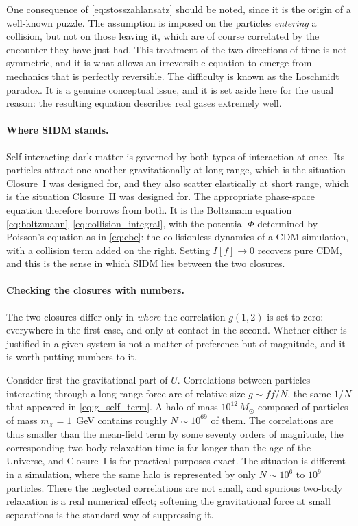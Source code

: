 \documentclass[12pt]{article}
\newcommand{\Msun}{\,M_\odot}
\begin{document}
One consequence of \eqref{eq:stosszahlansatz} should be noted, since it
is the origin of a well-known puzzle.  The assumption is imposed on the
particles \emph{entering} a collision, but not on those leaving it,
which are of course correlated by the encounter they have just had.
This treatment of the two directions of time is not symmetric, and it
is what allows an irreversible equation to emerge from mechanics that
is perfectly reversible.  The difficulty is known as the Loschmidt
paradox.  It is a genuine conceptual issue, and it is set aside here
for the usual reason: the resulting equation describes real gases
extremely well.

\paragraph{Where SIDM stands.}  Self-interacting dark matter is
governed by both types of interaction at once.  Its particles attract
one another gravitationally at long range, which is the situation
Closure~I was designed for, and they also scatter elastically at short
range, which is the situation Closure~II was designed for.  The
appropriate phase-space equation therefore borrows from both.  It is
the Boltzmann equation
\eqref{eq:boltzmann}--\eqref{eq:collision_integral}, with the potential
$\Phi$ determined by Poisson's equation as in \eqref{eq:cbe}: the
collisionless dynamics of a CDM simulation, with a collision term added
on the right.  Setting $I[f]\to 0$ recovers pure CDM, and this is the
sense in which SIDM lies between the two closures.

\paragraph{Checking the closures with numbers.}  The two closures
differ only in \emph{where} the correlation $g(1,2)$ is set to zero:
everywhere in the first case, and only at contact in the second.
Whether either is justified in a given system is not a matter of
preference but of magnitude, and it is worth putting numbers to it.

Consider first the gravitational part of $U$.  Correlations between
particles interacting through a long-range force are of relative size
$g\sim ff/N$, the same $1/N$ that appeared in \eqref{eq:g_self_term}.
A halo of mass $10^{12}\Msun$ composed of particles of mass
$m_\chi = 1$~GeV contains roughly $N\sim10^{69}$ of them.  The
correlations are thus smaller than the mean-field term by some seventy
orders of magnitude, the corresponding two-body relaxation time is far
longer than the age of the Universe, and Closure~I is for practical
purposes exact.  The situation is different in a simulation, where the
same halo is represented by only $N\sim10^{6}$ to $10^{9}$ particles.
There the neglected correlations are not small, and spurious two-body
relaxation is a real numerical effect; softening the gravitational
force at small separations is the standard way of suppressing it.
\end{document}
